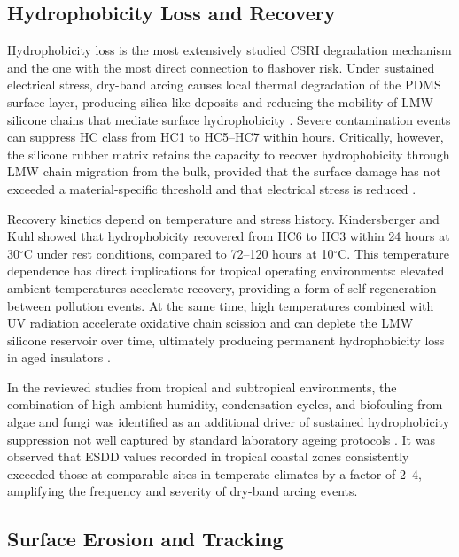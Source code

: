 \documentclass[preprint,12pt,3p]{elsarticle}
\begin{document}
\subsection{Hydrophobicity Loss and Recovery}

Hydrophobicity loss is the most extensively studied CSRI degradation
mechanism and the one with the most direct connection to flashover
risk. Under sustained electrical stress, dry-band arcing causes local
thermal degradation of the PDMS surface layer, producing silica-like
deposits and reducing the mobility of LMW silicone chains that mediate
surface hydrophobicity \cite{Gubanski1990}. Severe contamination events
can suppress HC class from HC1 to HC5--HC7 within hours. Critically,
however, the silicone rubber matrix retains the capacity to recover
hydrophobicity through LMW chain migration from the bulk, provided
that the surface damage has not exceeded a material-specific threshold
and that electrical stress is reduced \cite{Kindersberger2008}.

Recovery kinetics depend on temperature and stress history. Kindersberger
and Kuhl \cite{Kindersberger2008} showed that hydrophobicity recovered
from HC6 to HC3 within 24 hours at 30$^\circ$C under rest conditions,
compared to 72--120 hours at 10$^\circ$C. This temperature dependence
has direct implications for tropical operating environments: elevated
ambient temperatures accelerate recovery, providing a form of
self-regeneration between pollution events. At the same time, high
temperatures combined with UV radiation accelerate oxidative chain
scission and can deplete the LMW silicone reservoir over time, ultimately
producing permanent hydrophobicity loss in aged insulators
\cite{Ramirez2020, Ramirez2020}.

In the reviewed studies from tropical and subtropical environments,
the combination of high ambient humidity, condensation cycles, and
biofouling from algae and fungi was identified as an additional driver
of sustained hydrophobicity suppression not well captured by standard
laboratory ageing protocols \cite{Montoya2016, BrittleFracture2021}. It was
observed that ESDD values recorded in tropical coastal zones
consistently exceeded those at comparable sites in temperate climates
by a factor of 2--4, amplifying the frequency and severity of
dry-band arcing events.

\subsection{Surface Erosion and Tracking}
\end{document}
